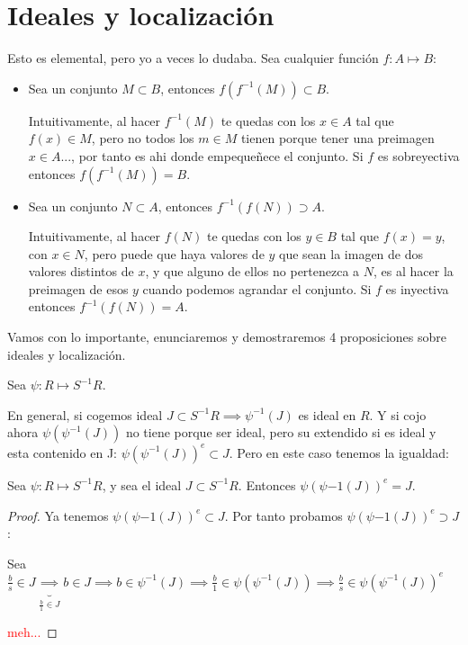 \section{Ideales y localización}

\nota Esto es elemental, pero yo a veces lo dudaba. Sea cualquier función $f: A \longmapsto B$:
\begin{itemize}
	\item Sea un conjunto $M \subset B$, entonces $f(f^{-1}(M)) \subset B$. 
	
	Intuitivamente, al hacer $f^{-1}(M)$ te quedas con los $x \in A$ tal que $f(x) \in M$, pero no todos los $m \in M$ tienen porque tener una preimagen $x \in A$..., por tanto es ahi donde empequeñece el conjunto. Si $f$ es sobreyectiva entonces $f(f^{-1}(M))= B$.
	\item Sea un conjunto $N \subset A$, entonces $f^{-1}(f(N)) \supset A$.
	
	Intuitivamente, al hacer $f(N)$ te quedas con los $y \in B$ tal que $f(x)=y$, con $x\in N$, pero puede que haya valores de $y$ que sean la imagen de dos valores distintos de $x$, y que alguno de ellos no pertenezca a $N$, es al hacer la preimagen de esos $y$ cuando podemos agrandar el conjunto. Si $f$ es inyectiva entonces $f^{-1}(f(N)) =  A$.
\end{itemize}

Vamos con lo importante, enunciaremos y demostraremos 4 proposiciones sobre ideales y localización.

Sea $\psi:R \longmapsto S^{-1}R$. 

En general, si cogemos ideal $J \subset S^{-1}R \implies \psi^{-1}(J)$ es ideal en $R$.  Y si cojo ahora $\psi(\psi^{-1}(J))$ no tiene porque ser ideal, pero su extendido si es ideal y esta contenido en J: $\psi(\psi^{-1}(J))^e \subset J$. Pero en este caso tenemos la igualdad:

\begin{prop}
	Sea $\psi:R \longmapsto S^{-1}R$, y sea el ideal $J \subset S^{-1}R$.  Entonces $\psi(\psi{-1}(J))^e = J$.
\end{prop}

\begin{proof}
	Ya tenemos $\psi(\psi{-1}(J))^e \subset J$. Por tanto probamos $\psi(\psi{-1}(J))^e \supset J$:
	
	Sea $\frac{b}{s} \in J \underbrace{\implies}_{\frac{b}{1}\in J} b \in J \implies b \in \psi^{-1}(J) \implies \frac{b}{1} \in \psi(\psi^{-1}(J)) \implies \frac{b}{s} \in \psi(\psi^{-1}(J))^e$
	
	\textcolor{red}{meh...}
\end{proof}


